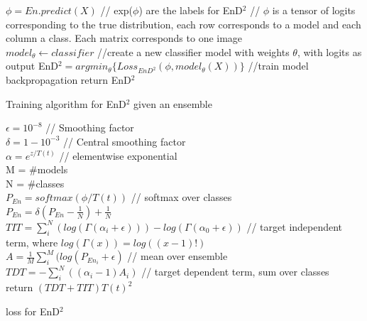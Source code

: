 \begin{algorithm}
  $\phi = En.predict(X)$ // exp($\phi$) are the labels for EnD$^2$ 
  // $\phi$ is a tensor of logits corresponding to the true distribution, each row corresponds to a model and each column a class. Each matrix corresponds to one image \\
  $model_{\theta} \leftarrow classifier$ //create a new classifier model with weights $\theta$, with logits as output 
  EnD$^2 = argmin_{\theta}\{Loss_{EnD^2}(\phi,model_{\theta}(X)) \}$ //train model backpropagation
  return EnD$^2$
  \caption{Training algorithm for EnD$^2$ given an ensemble}
  \label{alg:training}
\end{algorithm}

\begin{algorithm}
    $\epsilon = 10^{-8}$  // Smoothing factor\\
    $\delta = 1-10^{-3}$ // Central smoothing factor\\
    
    $\alpha = e^{z/T(t)}$ // elementwise exponential\\
    M = \#models \\
    N = \#classes \\
    $P_{En} = softmax(\phi/T(t))$ // softmax over classes\\
    $P_{En} = \delta(P_{En} - \frac{1}{N}) + \frac{1}{N}$\\
    $TIT = \sum_i^N(log(\Gamma(\alpha_i + \epsilon))) - log(\Gamma(
            \alpha_0 + \epsilon))  $ // target independent term, where $log(\Gamma(x)) = log((x - 1)!)$\\
    $A = \frac{1}{M}\sum^{M}_i(log(P_{En_i} + \epsilon)$ // mean over ensemble\\
    $TDT = -\sum_i^{N}((\alpha_i - 1) A_i)$  // target dependent term, sum over classes \\

    return $(TDT +TIT) T(t)^2$
    
    
    \label{alg:loss}
    \caption{loss for EnD$^2$}
\end{algorithm} 



